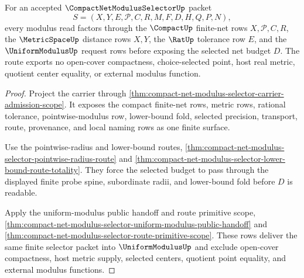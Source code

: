 \begin{theorem}
\label{thm:compact-net-modulus-selector-finite-net-budget-route}
For an accepted $\CompactNetModulusSelectorUp$ packet
$$
S=(X,Y,E,\mathcal{P},C,R,M,F,D,H,Q,P,N),
$$
every modulus read factors through the $\CompactUp$ finite-net rows $X,\mathcal{P},C,R$, the $\MetricSpaceUp$ distance rows $X,Y$, the $\RatUp$ tolerance row $E$, and the $\UniformModulusUp$ request rows before exposing the selected net budget $D$. The route exports no open-cover compactness, choice-selected point, host real metric, quotient center equality, or external modulus function.
\end{theorem}
\begin{proof}
Project the carrier through \autoref{thm:compact-net-modulus-selector-carrier-admission-scope}. It exposes the compact finite-net rows, metric rows, rational tolerance, pointwise-modulus row, lower-bound fold, selected precision, transport, route, provenance, and local naming rows as one finite surface.

Use the pointwise-radius and lower-bound routes, \autoref{thm:compact-net-modulus-selector-pointwise-radius-route} and \autoref{thm:compact-net-modulus-selector-lower-bound-route-totality}. They force the selected budget to pass through the displayed finite probe spine, subordinate radii, and lower-bound fold before $D$ is readable.

Apply the uniform-modulus public handoff and route primitive scope, \autoref{thm:compact-net-modulus-selector-uniform-modulus-public-handoff} and \autoref{thm:compact-net-modulus-selector-route-primitive-scope}. These rows deliver the same finite selector packet into $\UniformModulusUp$ and exclude open-cover compactness, host metric supply, selected centers, quotient point equality, and external modulus functions.
\end{proof}

